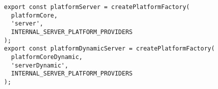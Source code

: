 \begin{verbatim}
export const platformServer = createPlatformFactory(
  platformCore,
  'server',
  INTERNAL_SERVER_PLATFORM_PROVIDERS
);
export const platformDynamicServer = createPlatformFactory(
  platformCoreDynamic,
  'serverDynamic',
  INTERNAL_SERVER_PLATFORM_PROVIDERS
);
\end{verbatim}
